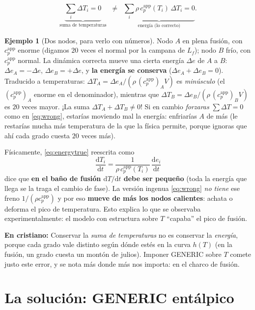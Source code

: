 \documentclass[11pt]{article}
\newcommand{\dd}{\mathrm{d}}
\newcommand{\cpapp}{c_p^{\mathrm{app}}}
\theoremstyle{definition}
\newtheorem{ejemplo}{Ejemplo}[section]
\theoremstyle{plain}
\newcommand{\dummies}[1]{%
  \par\smallskip\noindent
  \colorbox{yellow!18}{\parbox{\dimexpr\linewidth-2\fboxsep}{%
  \small\textbf{En cristiano:} #1}}\par\smallskip}
\begin{document}
\begin{equation}
  \underbrace{\sum_i \Delta T_i = 0}_{\text{suma de temperaturas}}
  \;\;\neq\;\;
  \underbrace{\sum_i \rho\,\cpapp(T_i)\,\Delta T_i = 0}_{\text{energía (lo correcto)}}.
  \label{eq:wrongcons}
\end{equation}

\begin{ejemplo}[Dos nodos, para verlo con números]
Nodo $A$ en plena fusión, con $\cpapp$ enorme (digamos $20$ veces el normal por la
campana de $L_f$); nodo $B$ frío, con $\cpapp$ normal. La dinámica correcta mueve
una cierta energía $\Delta e$ de $A$ a $B$: $\Delta e_A=-\Delta e$,
$\Delta e_B=+\Delta e$, y \textbf{la energía se conserva} ($\Delta e_A+\Delta e_B=0$).
Traducido a temperaturas: $\Delta T_A=\Delta e_A/(\rho\,(\cpapp)_A V)$ es
\emph{minúsculo} (el $(\cpapp)_A$ enorme en el denominador), mientras que
$\Delta T_B=\Delta e_B/(\rho\,(\cpapp)_B V)$ es $20$ veces mayor. ¡La suma
$\Delta T_A+\Delta T_B\neq0$! Si en cambio \emph{forzaras} $\sum\Delta T=0$ como en
\eqref{eq:wrong}, estarías moviendo mal la energía: enfriarías $A$ de más
(le restarías mucha más temperatura de la que la física permite, porque ignoras que
ahí cada grado cuesta $20$ veces más).
\end{ejemplo}

Físicamente, \eqref{eq:energytrue} reescrita como
\begin{equation}
  \frac{\dd T_i}{\dd t} = \frac{1}{\rho\,\cpapp(T_i)}\,\frac{\dd e_i}{\dd t}
  \label{eq:correctT}
\end{equation}
dice que \textbf{en el baño de fusión $\dd T/\dd t$ debe ser pequeño} (toda la
energía que llega se la traga el cambio de fase). La versión ingenua
\eqref{eq:wrong} \emph{no tiene} ese freno $1/(\rho\cpapp)$ y por eso
\textbf{mueve de más los nodos calientes}: achata o deforma el pico de temperatura.
Esto explica lo que se observaba experimentalmente: el modelo con estructura sobre
$T$ ``capaba'' el pico de fusión.

\dummies{Conservar la \emph{suma de temperaturas} no es conservar la \emph{energía},
porque cada grado vale distinto según dónde estés en la curva $h(T)$ (en la fusión,
un grado cuesta un montón de julios). Imponer GENERIC sobre $T$ comete justo este
error, y se nota más donde más nos importa: en el charco de fusión.}

\section{La solución: GENERIC entálpico}
\label{sec:enthalpic}
\end{document}

